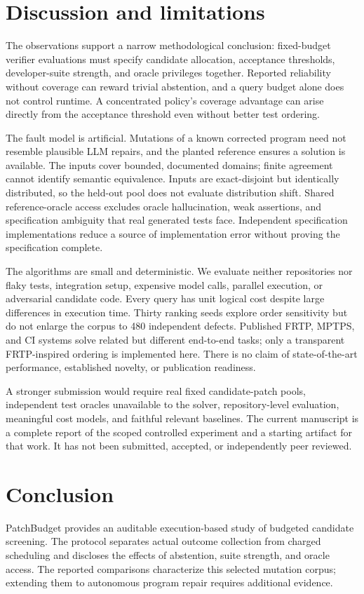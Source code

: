\documentclass[10pt]{article}
\begin{document}
\section{Discussion and limitations}
The observations support a narrow methodological conclusion: fixed-budget verifier evaluations must specify candidate allocation, acceptance thresholds, developer-suite strength, and oracle privileges together. Reported reliability without coverage can reward trivial abstention, and a query budget alone does not control runtime. A concentrated policy's coverage advantage can arise directly from the acceptance threshold even without better test ordering.

The fault model is artificial. Mutations of a known corrected program need not resemble plausible LLM repairs, and the planted reference ensures a solution is available. The inputs cover bounded, documented domains; finite agreement cannot identify semantic equivalence. Inputs are exact-disjoint but identically distributed, so the held-out pool does not evaluate distribution shift. Shared reference-oracle access excludes oracle hallucination, weak assertions, and specification ambiguity that real generated tests face. Independent specification implementations reduce a source of implementation error without proving the specification complete.

The algorithms are small and deterministic. We evaluate neither repositories nor flaky tests, integration setup, expensive model calls, parallel execution, or adversarial candidate code. Every query has unit logical cost despite large differences in execution time. Thirty ranking seeds explore order sensitivity but do not enlarge the corpus to 480 independent defects. Published FRTP, MPTPS, and CI systems solve related but different end-to-end tasks; only a transparent FRTP-inspired ordering is implemented here. There is no claim of state-of-the-art performance, established novelty, or publication readiness.

A stronger submission would require real fixed candidate-patch pools, independent test oracles unavailable to the solver, repository-level evaluation, meaningful cost models, and faithful relevant baselines. The current manuscript is a complete report of the scoped controlled experiment and a starting artifact for that work. It has not been submitted, accepted, or independently peer reviewed.

\section{Conclusion}
PatchBudget provides an auditable execution-based study of budgeted candidate screening. The protocol separates actual outcome collection from charged scheduling and discloses the effects of abstention, suite strength, and oracle access. The reported comparisons characterize this selected mutation corpus; extending them to autonomous program repair requires additional evidence.
\end{document}
